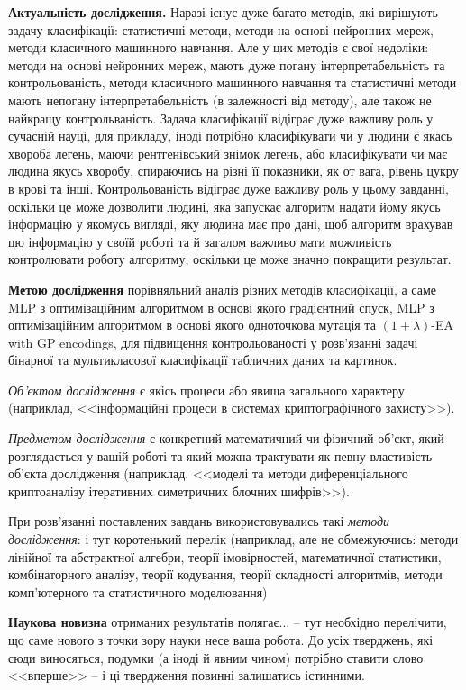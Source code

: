 \textbf{Актуальність дослідження.} Наразі існує дуже багато методів, які вирішують задачу класифікації: статистичні методи, методи на основі нейронних мереж, методи класичного машинного навчання. Але у цих методів є свої недоліки: методи на основі нейронних мереж, мають дуже погану інтерпретабельність та контрольованість, методи класичного машинного навчання та статистичні методи мають непогану інтерпретабельність (в залежності від методу), але також не найкращу контрольваність. Задача класифікації відіграє дуже важливу роль у сучасній науці, для прикладу, іноді потрібно класифікувати чи у людини є якась хвороба легень, маючи рентгенівський знімок легень, або класифікувати чи має людина якусь хворобу, спираючись на різні її показники, як от вага, рівень цукру в крові та інші. Контрольованість відіграє дуже важливу роль у цьому завданні, оскільки це може дозволити людині, яка запускає алгоритм надати йому якусь інформацію у якомусь вигляді, яку людина має про дані, щоб алгоритм врахував цю інформацію у своїй роботі та й загалом важливо мати можливість контролювати роботу алгоритму, оскільки це може значно покращити результат.

\textbf{Метою дослідження} порівняльний аналіз різних методів класифікації, а саме MLP з оптимізаційним алгоритмом в основі якого градієнтний спуск, MLP з оптимізаційним алгоритмом в основі якого одноточкова мутація та $(1+\lambda)$-EA with GP encodings, для підвищення контрольованості у розв'язанні задачі бінарної та мультикласової класифікації табличних даних та картинок.

\emph{Об'єктом дослідження} є якісь процеси або явища загального 
характеру (наприклад, <<інформаційні процеси в системах криптографічного 
захисту>>).

\emph{Предметом дослідження} є конкретний математичний чи фізичний 
об'єкт, який розглядається у вашій роботі та який можна трактувати
як певну властивість об'єкта дослідження (наприклад, <<моделі та методи
диференціального криптоаналізу ітеративних симетричних блочних шифрів>>).

При розв’язанні поставлених завдань використовувались такі \emph{методи дослідження}: і 
тут коротенький перелік (наприклад, але не обмежуючись: методи лінійної та абстрактної 
алгебри, теорії імовірностей, математичної статистики, комбінаторного 
аналізу, теорії кодування, теорії складності алгоритмів, методи 
комп’ютерного та статистичного моделювання) 

\textbf{Наукова новизна} отриманих результатів полягає... -- тут необхідно 
перелічити, що саме нового з точки зору науки несе ваша робота. До усіх 
тверджень, які сюди виносяться, подумки (а іноді й явним чином) потрібно 
ставити слово <<вперше>> -- і ці твердження повинні залишатись істинними.

